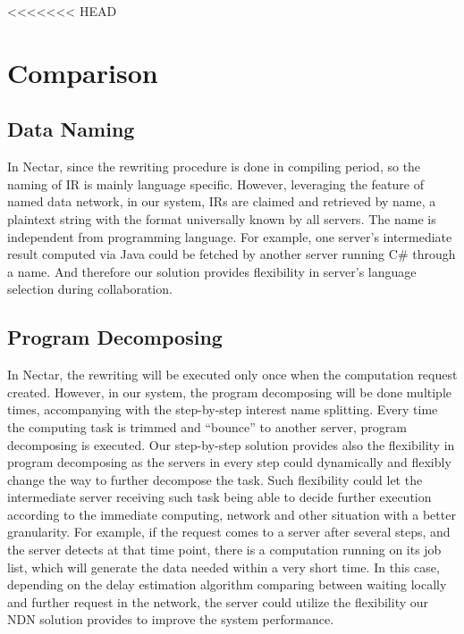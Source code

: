 <<<<<<< HEAD
\section{Comparison}
\subsection{Data Naming}
In Nectar, since the rewriting procedure is done in compiling period, so the naming of IR is mainly language specific. However, leveraging the feature of named data network, in our system, IRs are claimed and retrieved by name, a plaintext string with the format universally known by all servers. The name is independent from programming language. For example, one server’s intermediate result computed via Java could be fetched by another server running C\# through a name. And therefore our solution provides flexibility in server’s language selection during collaboration.
\subsection{Program Decomposing}
In Nectar, the rewriting will be executed only once when the computation request created. However, in our system, the program decomposing will be done multiple times, accompanying with the step-by-step interest name splitting.  Every time the computing task is trimmed and “bounce” to another server, program decomposing is executed. Our step-by-step solution provides also the flexibility in program decomposing as the servers in every step could dynamically and flexibly change the way to further decompose the task. Such flexibility could let the intermediate server receiving such task being able to decide further execution according to the immediate computing, network and other situation with a better granularity. For example, if the request comes to a server after several steps, and the server detects at that time point, there is a computation running on its job list, which will generate the data needed within a very short time. In this case, depending on the delay estimation algorithm comparing between waiting locally and further request in the network, the server could utilize the flexibility our NDN solution provides to improve the system performance.
